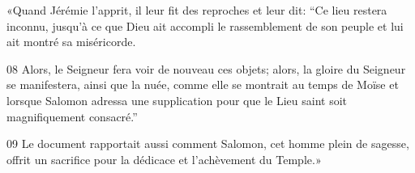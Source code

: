 
«Quand Jérémie l’apprit, il leur fit des reproches et leur dit: “Ce lieu restera inconnu, jusqu’à ce que Dieu ait accompli le rassemblement de son peuple et lui ait montré sa miséricorde.

08 Alors, le Seigneur fera voir de nouveau ces objets; alors, la gloire du Seigneur se manifestera, ainsi que la nuée, comme elle se montrait au temps de Moïse et lorsque Salomon adressa une supplication pour que le Lieu saint soit magnifiquement consacré.”

09 Le document rapportait aussi comment Salomon, cet homme plein de sagesse, offrit un sacrifice pour la dédicace et l’achèvement du Temple.»